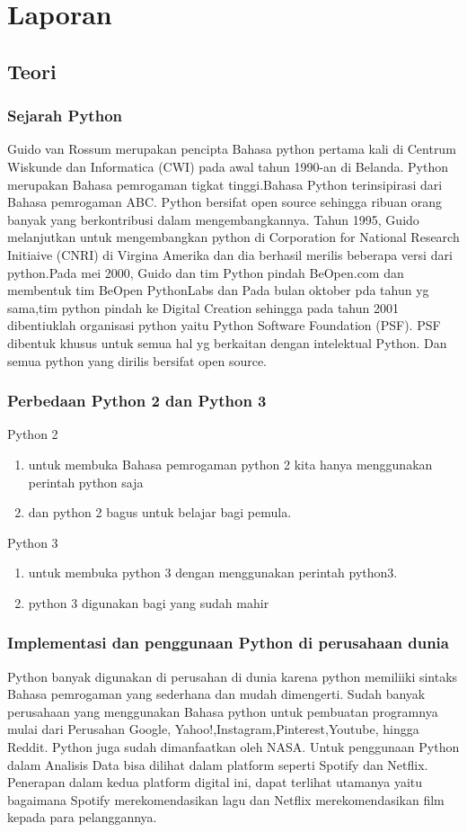 \chapter{Laporan}
\section{Teori}
\subsection{Sejarah Python}
Guido van Rossum merupakan pencipta Bahasa python pertama kali di Centrum Wiskunde dan Informatica (CWI) pada awal tahun 1990-an di Belanda. Python merupakan Bahasa pemrogaman tigkat tinggi.Bahasa Python terinsipirasi dari Bahasa pemrogaman ABC. Python bersifat open source sehingga ribuan orang banyak yang berkontribusi dalam mengembangkannya. Tahun 1995, Guido melanjutkan untuk mengembangkan python di Corporation for National Research Initiaive (CNRI) di Virgina Amerika dan dia berhasil merilis beberapa versi dari python.Pada mei 2000, Guido dan tim Python pindah BeOpen.com dan membentuk tim BeOpen PythonLabs dan Pada bulan oktober pda tahun yg sama,tim python pindah ke Digital Creation  sehingga pada tahun 2001 dibentiuklah organisasi python yaitu Python Software Foundation (PSF). PSF dibentuk khusus untuk semua hal yg berkaitan dengan intelektual Python. Dan semua python yang dirilis bersifat open source. 
\subsection{Perbedaan Python 2 dan Python 3}
Python 2
	\begin{enumerate}
		\item untuk membuka Bahasa pemrogaman python 2 kita hanya menggunakan perintah python saja
		\item dan python 2 bagus untuk belajar bagi pemula.
	\end{enumerate}
	\hfill \break
Python 3
	\begin{enumerate}
		\item untuk membuka python 3 dengan menggunakan perintah python3. 
		\item python 3 digunakan bagi yang sudah mahir
	\end{enumerate}
\subsection{Implementasi dan penggunaan Python di perusahaan dunia}
Python banyak digunakan di perusahan di dunia karena python memiliiki sintaks Bahasa pemrogaman yang sederhana dan mudah dimengerti. Sudah banyak perusahaan yang menggunakan Bahasa python untuk pembuatan programnya mulai dari Perusahan Google, Yahoo!,Instagram,Pinterest,Youtube, hingga Reddit. Python juga sudah dimanfaatkan oleh NASA. Untuk penggunaan Python dalam Analisis Data bisa dilihat dalam platform seperti Spotify dan Netflix. Penerapan dalam kedua platform digital ini, dapat terlihat utamanya yaitu bagaimana Spotify merekomendasikan lagu dan Netflix merekomendasikan film kepada para pelanggannya.
